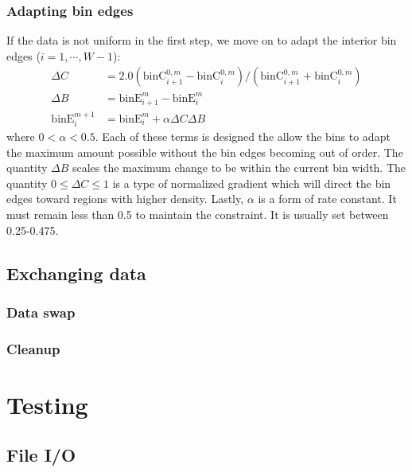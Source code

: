 \documentclass{article}
\begin{document}
\subsubsection{Adapting bin edges}
If the data is not uniform in the first step, we move on to adapt the interior bin edges ($i = 1, \cdots, W-1$):
\begin{equation}
	\begin{split}
		\Delta C & = 2.0 ( \textrm{binC}^{0,m}_{i+1} - \textrm{binC}^{0,m}_i ) / ( \textrm{binC}^{0,m}_{i+1} + \textrm{binC}^{0,m}_i ) \\
		\Delta B & = \textrm{binE}^m_{i+1} - \textrm{binE}^m_i \\
		\textrm{binE}^{m+1}_i & = \textrm{binE}^m_i + \alpha \Delta C \Delta B
	\end{split}
\end{equation}
where $0 < \alpha < 0.5$. Each of these terms is designed the allow the bins to adapt the maximum amount possible without the bin edges becoming out of order. The quantity $\Delta B$ scales the maximum change to be within the current bin width. The quantity $0 \le \Delta C \le 1$ is a type of normalized gradient which will direct the bin edges toward regions with higher density. Lastly, $\alpha$ is a form of rate constant. It must remain less than 0.5 to maintain the constraint. It is usually set between 0.25-0.475.







\subsection{Exchanging data}
\subsubsection{Data swap}
\subsubsection{Cleanup}


\section{Testing}


\subsection{File I/O}
\end{document}
